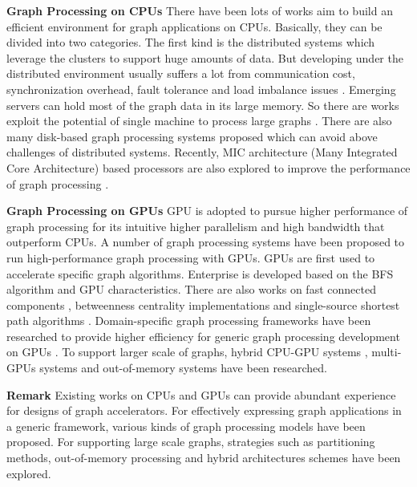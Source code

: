 \documentclass[twoside]{article}
\begin{document}
\begin{multicols}{2}
{\bf Graph Processing on CPUs}\quad
There have been lots of works aim to build an efficient environment for graph applications on CPUs. Basically, they can be divided into two categories. The first kind is the distributed systems \cite{Malewicz2010pregel, Gonzalez2012powergraph,giraph,Gonzalez2014graphx, teixeira2015arabesque, chen2015powerlyra, Zhu2016gemini} which leverage the clusters to support huge amounts of data. But developing under the distributed environment usually suffers a lot from communication cost, synchronization overhead, fault tolerance and load imbalance issues \cite{khayyat2013mizan,randles2010comparative,zhao2014lightgraph,wang2014replication}. Emerging servers can hold most of the graph data in its large memory. So there are works exploit the potential of single machine to process large graphs \cite{Shun2013ligra, nguyen2013galois, sundaram2015graphmat,Zhang2015numa-aware}. There are also many disk-based graph processing systems proposed \cite{ Kyrola2012graphchi, Roy2013x-stream, han2013turbograph, yuan2014pathgraph, zhu2015gridgraph, chi2016nxgraph} which can avoid above challenges of distributed systems. Recently, MIC architecture (Many Integrated Core Architecture) based processors are also explored to improve the performance of graph processing \cite{Maass2017mosaic}.


{\bf Graph Processing on GPUs}\quad
GPU is adopted to pursue higher performance of graph processing for its intuitive higher parallelism and high bandwidth that outperform CPUs. A number of graph processing systems \cite{Wang2016gunrock,khorasani2014cusha,zhong2014medusa,seo2015gstream} have been proposed to run high-performance graph processing with GPUs. GPUs are first used to accelerate specific graph algorithms. Enterprise \cite{liu2015enterprise} is developed
based on the BFS algorithm and GPU characteristics. There are also works on fast connected components \cite{soman2010fast}, betweenness centrality implementations \cite{mclaughlin2014scalableBC,pande2011computingBC,sariyuce2013betweenness} and single-source shortest path algorithms \cite{davidson2014work}. Domain-specific graph processing frameworks have been researched to provide higher efficiency for generic graph processing development on GPUs \cite{Hong2012green-marl}. To support larger scale of graphs, hybrid CPU-GPU systems \cite{gharaibeh2013totem, zhang2015ggraph}, multi-GPUs systems \cite{liu2016ibfs, ben2017groute} and out-of-memory systems \cite{sengupta2015graphreduce, kim2016gts} have been researched.

{\bf Remark}\quad
Existing works on CPUs and GPUs can provide abundant experience for designs of graph accelerators. For effectively expressing graph applications in a generic framework, various kinds of graph processing models have been proposed. For supporting large scale graphs, strategies such as partitioning methods, out-of-memory processing and hybrid architectures schemes have been explored. 


\end{multicols}
\end{document}
